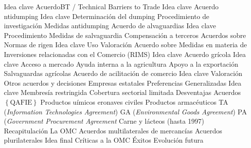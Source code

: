 \documentclass{nuevotema}
\begin{document}
\begin{esquema}[enumerate]
			\3 Idea clave
		\2 AcuerdoBT / Technical Barriers to Trade
			\3 Idea clave
		\2 Acuerdo ntidumping
			\3 Idea clave
			\3 Determinación del dumping
			\3 Procedimiento de investigación
			\3 Medidas antidumping
		\2 Acuerdo de alvaguardias
			\3 Idea clave
			\3 Procedimiento
			\3 Medidas de salvaguardia
			\3 Compensación a terceros
		\2 Acuerdos sobre Normas de rigen
			\3 Idea clave
			\3 Uso
			\3 Valoración
		\2 Acuerdo sobre Medidas en materia de Inversiones relacionadas con el Comercio (RIMS)
			\3 Idea clave
		\2 Acuerdo grícola
			\3 Idea clave
			\3 Acceso a mercado
			\3 Ayuda interna a la agricultura
			\3 Apoyo a la exportación
			\3 Salvaguardas agrícolas
		\2 Acuerdo de acilitación de comercio
			\3 Idea clave
			\3 Valoración
		\2 Otros acuerdos y decisiones
			\3 Empresas estatales
			\3 Preferencias Generalizadas
	\1 
		\2 Idea clave
			\3 Membresía restringida
			\3 Cobertura sectorial limitada
			\3 Desventajas
		\2 Acuerdos $\left\lbrace \text{QAFIE} \right\rbrace$
			\3 Productos uímicos
			\3 eronaves civiles
			\3 Productos armacéuticos
			\3 TA (\textit{Information Technologies Agreement})
			\3 GA (\textit{Environmental Goods Agreement})
			\3 PA (\textit{Government Procurement Agreement}
			\3 Carne y lácteos (hasta 1997)
	\1[] 
		\2 Recapitulación
			\3 La OMC
			\3 Acuerdos multilaterales de mercancías
			\3 Acuerdos plurilaterales
		\2 Idea final
			\3 Críticas a la OMC
			\3 Éxitos
			\3 Evolución futura

\end{esquema}

\esquemalargo
\end{document}
